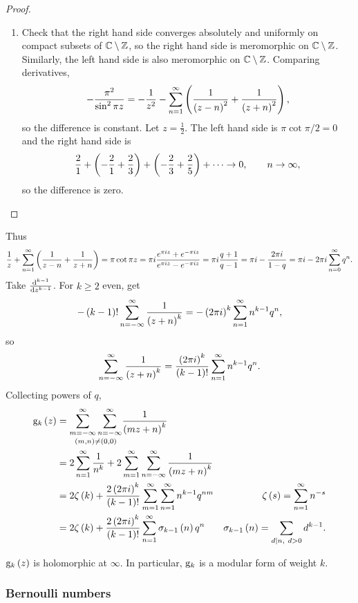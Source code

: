 \begin{proof}
\begin{enumerate}
\item Check that the right hand side converges absolutely and uniformly on compact subsets of $ \mathbb{C} \setminus \mathbb{Z} $, so the right hand side is meromorphic on $ \mathbb{C} \setminus \mathbb{Z} $. Similarly, the left hand side is also meromorphic on $ \mathbb{C} \setminus \mathbb{Z} $. Comparing derivatives,
$$ -\dfrac{\pi^2}{\sin^2 \pi z} = -\dfrac{1}{z^2} - \sum_{n = 1}^\infty \br{\dfrac{1}{\br{z - n}^2} + \dfrac{1}{\br{z + n}^2}}, $$
so the difference is constant. Let $ z = \tfrac{1}{2} $. The left hand side is $ \pi\cot \pi / 2 = 0 $ and the right hand side is
$$ \dfrac{2}{1} + \br{-\dfrac{2}{1} + \dfrac{2}{3}} + \br{-\dfrac{2}{3} + \dfrac{2}{5}} + \dots \to 0, \qquad n \to \infty, $$
so the difference is zero.
\end{enumerate}
\end{proof}

Thus
$$ \dfrac{1}{z} + \sum_{n = 1}^\infty \br{\dfrac{1}{z - n} + \dfrac{1}{z + n}} = \pi\cot \pi z = \pi i\dfrac{e^{\pi iz} + e^{-\pi iz}}{e^{\pi iz} - e^{-\pi iz}} = \pi i\dfrac{q + 1}{q - 1} = \pi i - \dfrac{2\pi i}{1 - q} = \pi i - 2\pi i\sum_{n = 0}^\infty q^n. $$
Take $ \tod[k - 1]{}{z} $. For $ k \ge 2 $ even, get
$$ -\br{k - 1}!\sum_{n = -\infty}^\infty \dfrac{1}{\br{z + n}^k} = -\br{2\pi i}^k\sum_{n = 1}^\infty n^{k - 1}q^n, $$
so
$$ \sum_{n = -\infty}^\infty \dfrac{1}{\br{z + n}^k} = \dfrac{\br{2\pi i}^k}{\br{k - 1}!}\sum_{n = 1}^\infty n^{k - 1}q^n. $$
Collecting powers of $ q $,
\begin{align*}
\g_k\br{z}
& = \underset{\br{m, n} \ne \br{0, 0}}{\sum_{m = -\infty}^\infty \sum_{n = -\infty}^\infty} \dfrac{1}{\br{mz + n}^k} \\
& = 2\sum_{n = 1}^\infty \dfrac{1}{n^k} + 2\sum_{m = 1}^\infty \sum_{n = -\infty}^\infty \dfrac{1}{\br{mz + n}^k} \\
& = 2\zeta\br{k} + \dfrac{2\br{2\pi i}^k}{\br{k - 1}!}\sum_{m = 1}^\infty \sum_{n = 1}^\infty n^{k - 1}q^{nm} & \zeta\br{s} = \sum_{n = 1}^\infty n^{-s} \\
& = 2\zeta\br{k} + \dfrac{2\br{2\pi i}^k}{\br{k - 1}!}\sum_{n = 1}^\infty \sigma_{k - 1}\br{n}q^n & \sigma_{k - 1}\br{n} = \sum_{d \mid n, \ d > 0} d^{k - 1}.
\end{align*}

\begin{corollary}
$ \g_k\br{z} $ is holomorphic at $ \infty $. In particular, $ \mathrm{g}_k $ is a modular form of weight $ k $.
\end{corollary}

\subsubsection{Bernoulli numbers}

